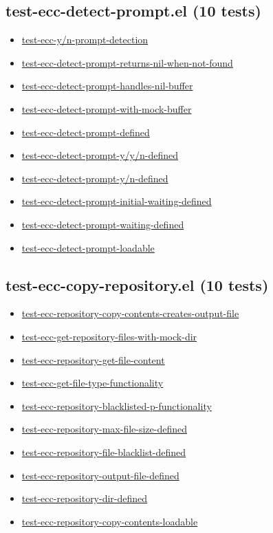 \documentclass[11pt]{article}
\begin{document}
\subsection{test-ecc-detect-prompt.el (10 tests)}
\label{sec:org326c30b}
\begin{itemize}
\item \href{test-ecc-detect-prompt.el}{test-ecc-y/n-prompt-detection}
\item \href{test-ecc-detect-prompt.el}{test-ecc-detect-prompt-returns-nil-when-not-found}
\item \href{test-ecc-detect-prompt.el}{test-ecc-detect-prompt-handles-nil-buffer}
\item \href{test-ecc-detect-prompt.el}{test-ecc-detect-prompt-with-mock-buffer}
\item \href{test-ecc-detect-prompt.el}{test-ecc-detect-prompt-defined}
\item \href{test-ecc-detect-prompt.el}{test-ecc-detect-prompt-y/y/n-defined}
\item \href{test-ecc-detect-prompt.el}{test-ecc-detect-prompt-y/n-defined}
\item \href{test-ecc-detect-prompt.el}{test-ecc-detect-prompt-initial-waiting-defined}
\item \href{test-ecc-detect-prompt.el}{test-ecc-detect-prompt-waiting-defined}
\item \href{test-ecc-detect-prompt.el}{test-ecc-detect-prompt-loadable}
\end{itemize}
\subsection{test-ecc-copy-repository.el (10 tests)}
\label{sec:orgc09080c}
\begin{itemize}
\item \href{test-ecc-copy-repository.el}{test-ecc-repository-copy-contents-creates-output-file}
\item \href{test-ecc-copy-repository.el}{test-ecc-get-repository-files-with-mock-dir}
\item \href{test-ecc-copy-repository.el}{test-ecc-repository-get-file-content}
\item \href{test-ecc-copy-repository.el}{test-ecc-get-file-type-functionality}
\item \href{test-ecc-copy-repository.el}{test-ecc-repository-blacklisted-p-functionality}
\item \href{test-ecc-copy-repository.el}{test-ecc-repository-max-file-size-defined}
\item \href{test-ecc-copy-repository.el}{test-ecc-repository-file-blacklist-defined}
\item \href{test-ecc-copy-repository.el}{test-ecc-repository-output-file-defined}
\item \href{test-ecc-copy-repository.el}{test-ecc-repository-dir-defined}
\item \href{test-ecc-copy-repository.el}{test-ecc-repository-copy-contents-loadable}
\end{itemize}
\end{document}
